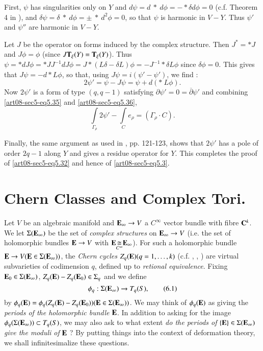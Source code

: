 First, $\psi$ has singularities only on $Y$ and $d\psi=d \ * \ d\phi=-*\delta d\phi=0$ (c.f. Theorem 4 in \cite{art08-key17}), and $\delta\psi=\delta \ * \ d\phi=\pm \ * \ d^{2}\phi=0$, so that $\psi$ is harmonic in $V-Y$. Thus $\psi'$ and $\psi''$ are harmonic in $V-Y$.

Let $J$ be the operator on forms induced by the complex structure. Then $J^{*}=*J$ and $J\phi=\phi$ (since $J\mathbf{T}_{\xi}(Y)=\mathbf{T}_{\xi}(Y)$). Thus $\psi=*dJ\phi=*JJ^{-1}dJ\phi=J*(L\delta-\delta L)\phi=-J^{-1}*\delta L\phi$ since $\delta\phi=0$. This gives that $J\psi=-d*L\phi$, so that, using $J\psi=i(\psi'-\psi')$, we find :
\begin{equation*}
2\psi'=\psi-J\psi=\psi+d(* \ L\phi).\tag{5.36}\label{art08-sec5-eq5.36}
\end{equation*}\pageoriginale
Now $2\psi'$ is a form of type $(q,q-1)$ satisfying $\partial \psi'=0=\overline{\partial}\psi'$ and combining \eqref{art08-sec5-eq5.35} and \eqref{art08-sec5-eq5.36},
\begin{equation*}
\int\limits_{\Gamma_{\rho}}2\psi'-\int\limits_{C}e_{\rho}=(\Gamma_{\rho}\cdot C).\tag{5.37}\label{art08-sec5-eq5.37}
\end{equation*}

Finally, the same argument as used in \cite{art08-key17}, pp. 121-123, shows that $2\psi'$ has a pole of order $2q-1$ along $Y$ and gives a residue operator for $Y$. This completes the proof of \eqref{art08-sec5-eq5.32} and hence of \eqref{art08-sec5-eq5.3}.

\section{Chern Classes and Complex Tori.}\label{art08-sec6}

Let $V$ be an algebraic manifold and $\mathbf{E}_{\infty}\to V$ a $C^{\infty}$ vector bundle with fibre $\mathbf{C}^{k}$. We let $\Sigma(\mathbf{E}_{\infty})$ be the set of {\em complex structures} on $\mathbf{E}_{\infty}\to V$ (i.e. the set of holomorphic bundles $\mathbf{E}\to V$ with $\mathbf{E}\displaystyle{\mathop{\cong}\limits_{C^{\infty}}}\mathbf{E}_{\infty}$). For such a holomorphic bundle $\mathbf{E}\to V(\mathbf{E}\in \Sigma(\mathbf{E}_{\infty}))$, the {\em Chern cycles} $Z_{q}(\mathbf{E})(q=1,\ldots,k)$ (c.f. \cite{art08-key11}, \cite{art08-key12}, \cite{art08-key13}) are virtual subvarieties of codimension $q$, defined up to {\em retional equivalence}. Fixing $\mathbf{E}_{0}\in \Sigma(\mathbf{E}_{\infty})$, $Z_{q}(\mathbf{E})-Z_{q}(\mathbf{E}_{0})\in \Sigma_{q}$ and we define
\begin{equation*}
\phi_{q}:\Sigma(\mathbf{E}_{\infty})\to T_{q}(S),\tag{6.1}\label{art08-sec6-eq6.1}
\end{equation*}
by $\phi_{q}(\mathbf{E})=\phi_{q}(Z_{q}(\mathbf{E})-Z_{q}(\mathbf{E}_{0}))(\mathbf{E}\in \Sigma(\mathbf{E}_{\infty}))$. We may think of $\phi_{q}(\mathbf{E})$ as giving the {\em periods of the holomorphic bundle} $\mathbf{E}$. In addition to asking for the image $\phi_{q}(\Sigma(\mathbf{E}_{\infty}))\subset T_{q}(S)$, we may also ask to what extent {\em do the periods of} $\{\mathbf{E}\}\in \Sigma(\mathbf{E}_{\infty})$ {\em give the moduli of} $\mathbf{E}$ ? By putting things into the context of deformation theory, we shall infinitesimalize these questions.

